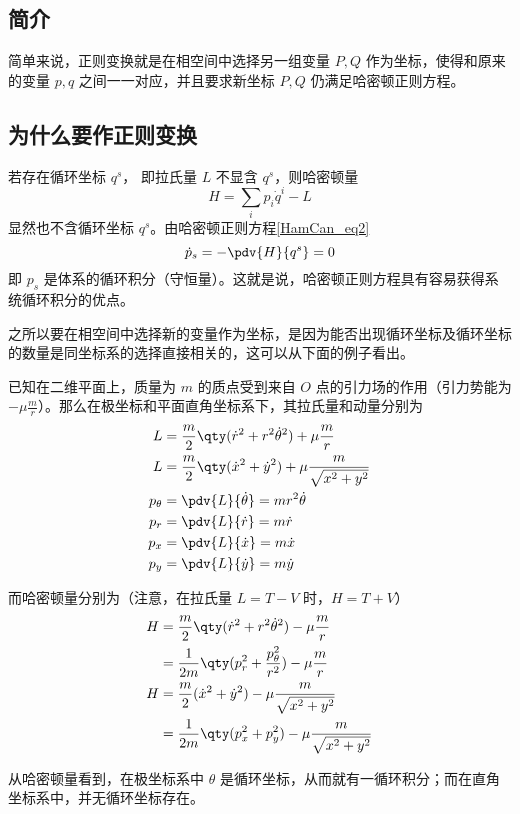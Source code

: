 
\begin{issues}
\issueDraft
\end{issues}

\subsection{简介}
简单来说，正则变换就是在相空间中选择另一组变量 $P,Q$ 作为坐标，使得和原来的变量 $p,q$ 之间一一对应，并且要求新坐标 $P,Q$ 仍满足哈密顿正则方程。
\subsection{为什么要作正则变换}
若存在循环坐标 $q^s$， 即拉氏量 $L$ 不显含 $q^s$，则哈密顿量
\begin{equation}
H=\sum_i p_i\dot q^i-L
\end{equation}
显然也不含循环坐标 $q^s$。由哈密顿正则方程\autoref{HamCan_eq2}~
\begin{equation}
\dot p_s=-\pdv{H}{q^s}=0
\end{equation}
即 $p_s$ 是体系的循环积分（守恒量）。这就是说，哈密顿正则方程具有容易获得系统循环积分的优点。

之所以要在相空间中选择新的变量作为坐标，是因为能否出现循环坐标及循环坐标的数量是同坐标系的选择直接相关的，这可以从下面的例子看出。
\begin{example}{}
已知在二维平面上，质量为 $m$ 的质点受到来自 $O$ 点的引力场的作用（引力势能为 $-\mu\frac{m}{r}$）。那么在极坐标和平面直角坐标系下，其拉氏量和动量分别为
\begin{equation}
\begin{aligned}
L&=\frac{m}{2}\qty(\dot r^2+r^2\dot\theta^2)+\mu\frac{m}{r}\\
L&=\frac{m}{2}\qty(\dot x^2+\dot y^2)+\mu\frac{m}{\sqrt{x^2+y^2}}\\
p_\theta&=\pdv{L}{\dot \theta}=mr^2\dot\theta\\
p_r&=\pdv{L}{\dot r}=m\dot r\\
p_x&=\pdv{L}{\dot x}=m\dot x\\
p_y&=\pdv{L}{\dot y}=m\dot y
\end{aligned}
\end{equation}

而哈密顿量分别为（注意，在拉氏量 $L=T-V$ 时，$H=T+V$）
\begin{equation}
\begin{aligned}
H&=\frac{m}{2}\qty(\dot r^2+r^2\dot\theta^2)-\mu\frac{m}{r}\\
&=\frac{1}{2m}\qty(p_r^2+\frac{p_\theta^2}{r^2})-\mu\frac{m}{r}\\
H&=\frac{m}{2}(\dot x^2+\dot y^2)-\mu\frac{m}{\sqrt{x^2+y^2}}\\
&=\frac{1}{2m}\qty(p_x^2+p_y^2)-\mu\frac{m}{\sqrt{x^2+y^2}}
\end{aligned}
\end{equation}

从哈密顿量看到，在极坐标系中 $\theta$ 是循环坐标，从而就有一循环积分；而在直角坐标系中，并无循环坐标存在。 
\end{example}



